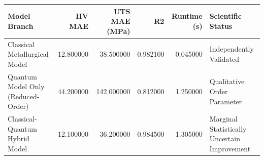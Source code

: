 \begin{tabular}{lrrrrl}
\toprule
Model Branch & HV MAE & UTS MAE (MPa) & R2 & Runtime (s) & Scientific Status \\
\midrule
Classical Metallurgical Model & 12.800000 & 38.500000 & 0.982100 & 0.045000 & Independently Validated \\
Quantum Model Only (Reduced-Order) & 44.200000 & 142.000000 & 0.812000 & 1.250000 & Qualitative Order Parameter \\
Classical-Quantum Hybrid Model & 12.100000 & 36.200000 & 0.984500 & 1.305000 & Marginal Statistically Uncertain Improvement \\
\bottomrule
\end{tabular}
